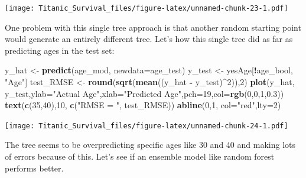 \documentclass[]{article}
\newenvironment{Shaded}{\begin{snugshade}}{\end{snugshade}}
\newcommand{\KeywordTok}[1]{\textcolor[rgb]{0.13,0.29,0.53}{\textbf{#1}}}
\newcommand{\DataTypeTok}[1]{\textcolor[rgb]{0.13,0.29,0.53}{#1}}
\newcommand{\DecValTok}[1]{\textcolor[rgb]{0.00,0.00,0.81}{#1}}
\newcommand{\FloatTok}[1]{\textcolor[rgb]{0.00,0.00,0.81}{#1}}
\newcommand{\StringTok}[1]{\textcolor[rgb]{0.31,0.60,0.02}{#1}}
\newcommand{\OperatorTok}[1]{\textcolor[rgb]{0.81,0.36,0.00}{\textbf{#1}}}
\newcommand{\NormalTok}[1]{#1}
\begin{document}
\texttt{[image: Titanic\_Survival\_files/figure-latex/unnamed-chunk-23-1.pdf]}

One problem with this single tree approach is that another random
starting point would generate an entirely different tree. Let's how this
single tree did as far as predicting ages in the test set:

\begin{Shaded}
\begin{Highlighting}[]
\NormalTok{y_hat <-}\StringTok{ }\KeywordTok{predict}\NormalTok{(age_mod, }\DataTypeTok{newdata=}\NormalTok{age_test)}
\NormalTok{y_test <-}\StringTok{ }\NormalTok{yesAge[}\OperatorTok{!}\NormalTok{age_bool, }\StringTok{"Age"}\NormalTok{]}
\NormalTok{test_RMSE <-}\StringTok{ }\KeywordTok{round}\NormalTok{(}\KeywordTok{sqrt}\NormalTok{(}\KeywordTok{mean}\NormalTok{((y_hat }\OperatorTok{-}\StringTok{ }\NormalTok{y_test)}\OperatorTok{^}\DecValTok{2}\NormalTok{)),}\DecValTok{2}\NormalTok{)}
\KeywordTok{plot}\NormalTok{(y_hat, y_test,}\DataTypeTok{ylab=}\StringTok{"Actual Age"}\NormalTok{,}\DataTypeTok{xlab=}\StringTok{"Predicted Age"}\NormalTok{,}\DataTypeTok{pch=}\DecValTok{19}\NormalTok{,}\DataTypeTok{col=}\KeywordTok{rgb}\NormalTok{(}\DecValTok{0}\NormalTok{,}\DecValTok{0}\NormalTok{,}\DecValTok{1}\NormalTok{,}\FloatTok{0.3}\NormalTok{))}
\KeywordTok{text}\NormalTok{(}\KeywordTok{c}\NormalTok{(}\DecValTok{35}\NormalTok{,}\DecValTok{40}\NormalTok{),}\DecValTok{10}\NormalTok{, }\KeywordTok{c}\NormalTok{(}\StringTok{"RMSE = "}\NormalTok{, test_RMSE))}
\KeywordTok{abline}\NormalTok{(}\DecValTok{0}\NormalTok{,}\DecValTok{1}\NormalTok{, }\DataTypeTok{col=}\StringTok{"red"}\NormalTok{,}\DataTypeTok{lty=}\DecValTok{2}\NormalTok{)}
\end{Highlighting}
\end{Shaded}

\texttt{[image: Titanic\_Survival\_files/figure-latex/unnamed-chunk-24-1.pdf]}

The tree seems to be overpredicting specific ages like 30 and 40 and
making lots of errors because of this. Let's see if an ensemble model
like random forest performs better.
\end{document}
